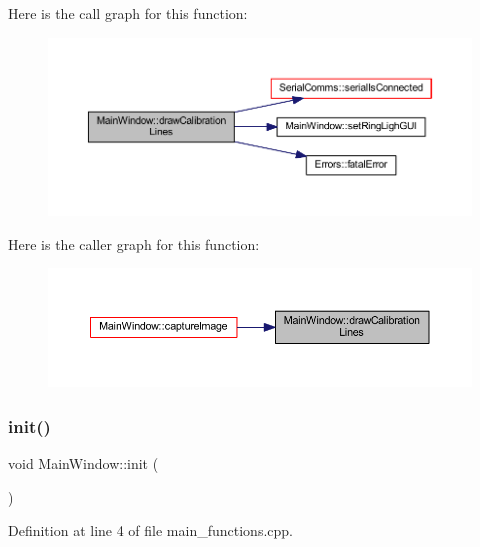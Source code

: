 Here is the call graph for this function\+:
\nopagebreak
\begin{figure}[H]
\begin{center}
\leavevmode
\includegraphics[width=350pt]{class_main_window_a46d10bf790a404b85083416112d51c08_cgraph}
\end{center}
\end{figure}
Here is the caller graph for this function\+:
\nopagebreak
\begin{figure}[H]
\begin{center}
\leavevmode
\includegraphics[width=350pt]{class_main_window_a46d10bf790a404b85083416112d51c08_icgraph}
\end{center}
\end{figure}
\mbox{\label{class_main_window_a671e7e5b0a3a7a3fb1cf44c5c8377952}} 
\subsubsection{\texorpdfstring{init()}{init()}}
{\footnotesize\ttfamily void Main\+Window\+::init (\begin{DoxyParamCaption}{ }\end{DoxyParamCaption})}



Definition at line 4 of file main\+\_\+functions.\+cpp.

